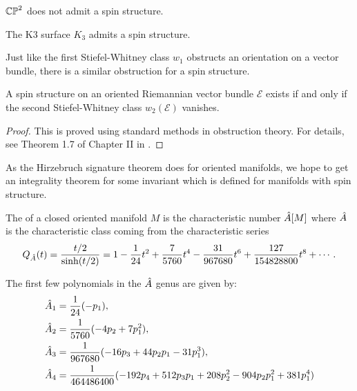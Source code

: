 \begin{example}
	$\mathbb{CP}^2$ does not admit a spin structure.
\end{example}

\begin{example}
	The K3 surface $K_3$ admits a spin structure.
\end{example}

Just like the first Stiefel-Whitney class $w_1$ obstructs an orientation on a vector bundle, there is a similar obstruction for a spin structure.

\begin{theorem}
	A spin structure on an oriented Riemannian vector bundle $\mathcal{E}$ exists if and only if the second Stiefel-Whitney class $w_2(\mathcal{E})$ vanishes.
\end{theorem}
\begin{proof}
	This is proved using standard methods in obstruction theory. For details, see Theorem 1.7 of Chapter II in \cite{lawson1989spin}.
\end{proof}


As the Hirzebruch signature theorem does for oriented manifolds, we hope to get an integrality theorem for some invariant which is defined for manifolds with spin structure. 

\begin{definition}
	The  of a closed oriented manifold $M$ is the characteristic number ${\hat{A}}[M]$ where ${\hat{A}}$ is the characteristic class coming from the characteristic series
	\[
		Q_{{\hat{A}}}(t) = \frac{t/2}{\sinh(t/2)} = 1 - \frac{1}{24} t^2 + \frac{7}{5760} t^4 - \frac{31}{967680} t^6 + \frac{127}{154828800}t^8+\cdots.
	\]
\end{definition}


\begin{example}
	The first few polynomials in the ${\hat{A}}$ genus are given by:
\[
	\begin{aligned}
		{\hat{A}}_1 &= \frac{1}{24}(-p_1),\\
		{\hat{A}}_2 &= \frac{1}{5760}(-4p_2 + 7p_1^2),\\
		{\hat{A}}_3 &= \frac{1}{967680}(-16p_3+44p_2p_1-31p_1^3),\\
		{\hat{A}}_4 &= \frac{1}{464486400}(-192p_4+512p_3p_1+208p_2^2-904p_2p_1^2+381p_1^4)
	\end{aligned}
\]
\end{example}

